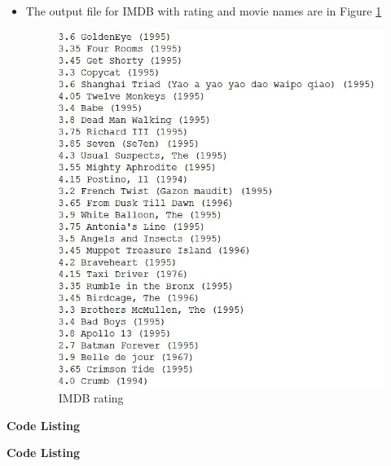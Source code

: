 \begin{itemize}
\newpage
\item The output file for IMDB with rating and movie names are in Figure \ref{fig:q5fig2}
\begin{figure}[h!]
\begin{center}
\hspace*{-3cm} 
\includegraphics[scale=0.55, keepaspectratio=true]{figures/3.JPG}
\caption{IMDB rating}
\label{fig:q5fig2}
\end{center}
\end{figure}
\end{itemize}

\newpage
\textbf{Code Listing}
\sloppy


\newpage
\textbf{Code Listing}
\sloppy
